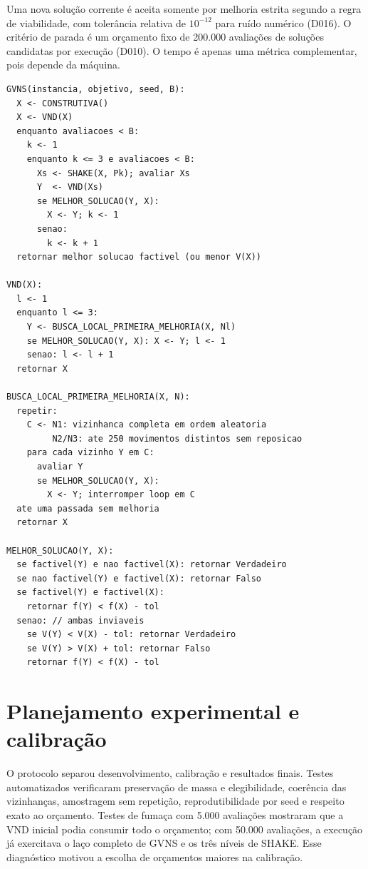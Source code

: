 \documentclass[10pt,twocolumn,a4paper]{article}
\begin{document}
Uma nova solução corrente é aceita somente por melhoria estrita segundo a regra de viabilidade, com tolerância relativa de $10^{-12}$ para ruído numérico (D016). O critério de parada é um orçamento fixo de 200.000 avaliações de soluções candidatas por execução (D010). O tempo é apenas uma métrica complementar, pois depende da máquina.

\begin{lstlisting}[float=t, caption={Pseudocódigo consolidado da GVNS e da regra de viabilidade.}, label={lst:pseudocodigo}]
GVNS(instancia, objetivo, seed, B):
  X <- CONSTRUTIVA()
  X <- VND(X)
  enquanto avaliacoes < B:
    k <- 1
    enquanto k <= 3 e avaliacoes < B:
      Xs <- SHAKE(X, Pk); avaliar Xs
      Y  <- VND(Xs)
      se MELHOR_SOLUCAO(Y, X):
        X <- Y; k <- 1
      senao:
        k <- k + 1
  retornar melhor solucao factivel (ou menor V(X))

VND(X):
  l <- 1
  enquanto l <= 3:
    Y <- BUSCA_LOCAL_PRIMEIRA_MELHORIA(X, Nl)
    se MELHOR_SOLUCAO(Y, X): X <- Y; l <- 1
    senao: l <- l + 1
  retornar X

BUSCA_LOCAL_PRIMEIRA_MELHORIA(X, N):
  repetir:
    C <- N1: vizinhanca completa em ordem aleatoria
         N2/N3: ate 250 movimentos distintos sem reposicao
    para cada vizinho Y em C:
      avaliar Y
      se MELHOR_SOLUCAO(Y, X):
        X <- Y; interromper loop em C
  ate uma passada sem melhoria
  retornar X

MELHOR_SOLUCAO(Y, X):
  se factivel(Y) e nao factivel(X): retornar Verdadeiro
  se nao factivel(Y) e factivel(X): retornar Falso
  se factivel(Y) e factivel(X):
    retornar f(Y) < f(X) - tol
  senao: // ambas inviaveis
    se V(Y) < V(X) - tol: retornar Verdadeiro
    se V(Y) > V(X) + tol: retornar Falso
    retornar f(Y) < f(X) - tol
\end{lstlisting}

\section{Planejamento experimental e calibração}

O protocolo separou desenvolvimento, calibração e resultados finais. Testes automatizados verificaram preservação de massa e elegibilidade, coerência das vizinhanças, amostragem sem repetição, reprodutibilidade por seed e respeito exato ao orçamento. Testes de fumaça com 5.000 avaliações mostraram que a VND inicial podia consumir todo o orçamento; com 50.000 avaliações, a execução já exercitava o laço completo de GVNS e os três níveis de SHAKE. Esse diagnóstico motivou a escolha de orçamentos maiores na calibração.
\end{document}
